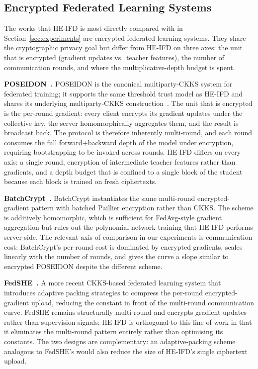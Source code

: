\subsection{Encrypted Federated Learning Systems}
\label{sec:bg_he_fl}

The works that HE-IFD is most directly compared with in Section~\ref{sec:experiments} are encrypted federated learning systems. They share the cryptographic privacy goal but differ from HE-IFD on three axes: the unit that is encrypted (gradient updates vs.\ teacher features), the number of communication rounds, and where the multiplicative-depth budget is spent.

\par\noindent\textbf{POSEIDON~\cite{sav2021poseidon}.} POSEIDON is the canonical multiparty-CKKS system for federated training; it supports the same threshold trust model as HE-IFD and shares its underlying multiparty-CKKS construction~\cite{mouchet2021multiparty}. The unit that is encrypted is the per-round gradient: every client encrypts its gradient updates under the collective key, the server homomorphically aggregates them, and the result is broadcast back. The protocol is therefore inherently multi-round, and each round consumes the full forward+backward depth of the model under encryption, requiring bootstrapping to be invoked across rounds. HE-IFD differs on every axis: a single round, encryption of intermediate teacher features rather than gradients, and a depth budget that is confined to a single block of the student because each block is trained on fresh ciphertexts.

\par\noindent\textbf{BatchCrypt~\cite{zhang2020batchcrypt}.} BatchCrypt instantiates the same multi-round encrypted-gradient pattern with batched Paillier encryption rather than CKKS. The scheme is additively homomorphic, which is sufficient for FedAvg-style gradient aggregation but rules out the polynomial-network training that HE-IFD performs server-side. The relevant axis of comparison in our experiments is communication cost: BatchCrypt's per-round cost is dominated by encrypted gradients, scales linearly with the number of rounds, and gives the curve a slope similar to encrypted POSEIDON despite the different scheme.

\par\noindent\textbf{FedSHE~\cite{wei2025fedshe}.} A more recent CKKS-based federated learning system that introduces adaptive packing strategies to compress the per-round encrypted-gradient upload, reducing the constant in front of the multi-round communication curve. FedSHE remains structurally multi-round and encrypts gradient updates rather than supervision signals; HE-IFD is orthogonal to this line of work in that it eliminates the multi-round pattern entirely rather than optimising its constants. The two designs are complementary: an adaptive-packing scheme analogous to FedSHE's would also reduce the size of HE-IFD's single ciphertext upload.


